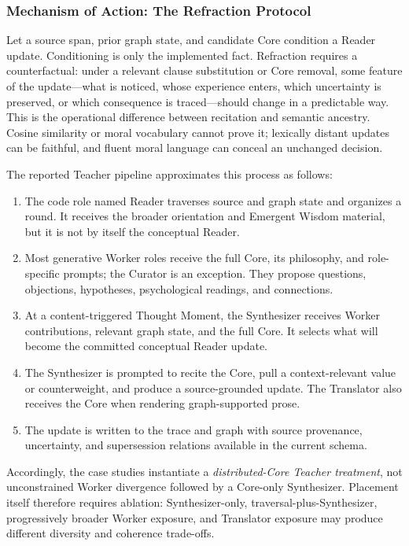 \subsubsection{Mechanism of Action: The Refraction Protocol}\label{sec:refraction-protocol}

Let a source span, prior graph state, and candidate Core condition a Reader
update. Conditioning is only the implemented fact. Refraction requires a
counterfactual: under a relevant clause substitution or Core removal, some
feature of the update---what is noticed, whose experience enters, which
uncertainty is preserved, or which consequence is traced---should change in a
predictable way. This is the operational difference between recitation and
semantic ancestry. Cosine similarity or moral vocabulary cannot prove it;
lexically distant updates can be faithful, and fluent moral language can conceal
an unchanged decision.

The reported Teacher pipeline approximates this process as follows:

\begin{enumerate}[leftmargin=*,itemsep=0.35em]
    \item The code role named Reader traverses source and graph state and
    organizes a round. It receives the broader orientation and Emergent Wisdom
    material, but it is not by itself the conceptual Reader.
    \item Most generative Worker roles receive the full Core, its philosophy,
    and role-specific prompts; the Curator is an exception. They propose
    questions, objections, hypotheses, psychological readings, and connections.
    \item At a content-triggered Thought Moment, the Synthesizer receives Worker
    contributions, relevant graph state, and the full Core. It selects what will
    become the committed conceptual Reader update.
    \item The Synthesizer is prompted to recite the Core, pull a
    context-relevant value or counterweight, and produce a source-grounded
    update. The Translator also receives the Core when rendering graph-supported
    prose.
    \item The update is written to the trace and graph with source provenance,
    uncertainty, and supersession relations available in the current schema.
\end{enumerate}

Accordingly, the case studies instantiate a
\emph{distributed-Core Teacher treatment}, not unconstrained Worker divergence
followed by a Core-only Synthesizer. Placement itself therefore requires
ablation: Synthesizer-only, traversal-plus-Synthesizer, progressively broader
Worker exposure, and Translator exposure may produce different diversity and
coherence trade-offs.

